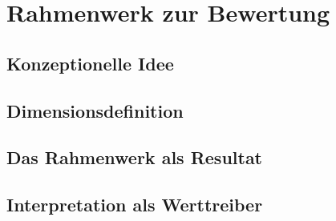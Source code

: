 \section{Rahmenwerk zur Bewertung}
\subsection{Konzeptionelle Idee}
\subsection{Dimensionsdefinition}
\subsection{Das Rahmenwerk als Resultat}
\subsection{Interpretation als Werttreiber}
